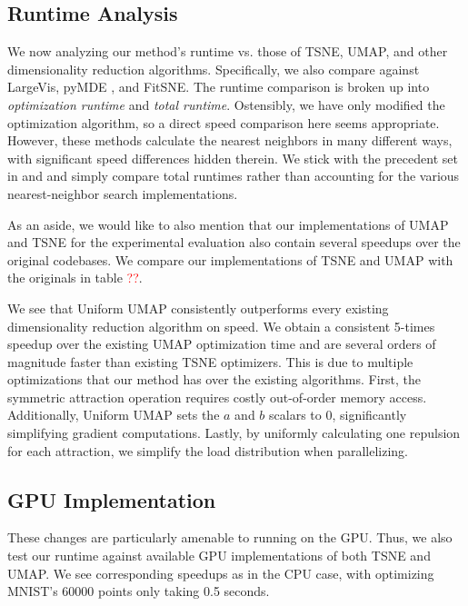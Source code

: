 \documentclass[sigconf, nonacm]{acmart}
\newcommand\ourmethod{Uniform UMAP }
\begin{document}
\subsection{Runtime Analysis}
We now analyzing our method's runtime vs. those of TSNE, UMAP, and other dimensionality reduction algorithms. Specifically, we also compare against LargeVis, pyMDE
\cite{agrawal2021minimum}, and FitSNE. The runtime comparison is broken up into \textit{optimization runtime} and \textit{total runtime}. Ostensibly, we have
only modified the optimization algorithm, so a direct speed comparison here seems appropriate. However, these methods calculate the nearest neighbors
in many different ways, with significant speed differences hidden therein. We stick with the precedent set in \cite{mcinnes2018umap} and
\cite{tang2016visualizing} and simply compare total runtimes rather than accounting for the various nearest-neighbor search implementations.

As an aside, we would like to also mention that our implementations of UMAP and TSNE for the experimental evaluation also contain several speedups over the original
codebases. We compare our implementations of TSNE and UMAP with the originals in table \textcolor{red}{??}.

We see that \ourmethod consistently outperforms every existing dimensionality reduction algorithm on speed. We obtain a consistent 5-times
speedup over the existing UMAP optimization time and are several orders of magnitude faster than existing TSNE optimizers. This is due to multiple optimizations
that our method has over the existing algorithms. First, the symmetric attraction operation requires costly out-of-order memory access. Additionally, \ourmethod
sets the $a$ and $b$ scalars to 0, significantly simplifying gradient computations. Lastly, by uniformly calculating one repulsion for each attraction, we
simplify the load distribution when parallelizing.

\subsection{GPU Implementation}
These changes are particularly amenable to running on the GPU. Thus, we also test our runtime against available GPU implementations of both TSNE and UMAP. We
see corresponding speedups as in the CPU case, with optimizing MNIST's 60000 points only taking 0.5 seconds.




\end{document}
